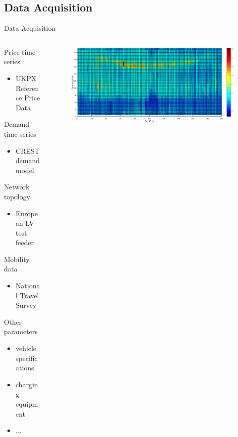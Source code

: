 \documentclass[handout]{beamer}
\begin{document}
\subsection{Data Acquisition}

\begin{frame}{Data Acquisition}
	\begin{columns}
		\begin{column}{5.5cm}
			\textcolor{UOEblue3}{Price time series}
			\begin{itemize}
				\item UKPX Reference Price Data
			\end{itemize}
			\textcolor{UOEpink}{Demand time series}
			\begin{itemize}
				\item CREST demand model
			\end{itemize}
			\textcolor{UOEorange}{Network topology}
			\begin{itemize}
				\item European LV test feeder
			\end{itemize}
			\textcolor{UOEgreen}{Mobility data}
			\begin{itemize}
				\item National Travel Survey
			\end{itemize}
			\textcolor{UOEyellow}{Other parameters}
			\begin{itemize}
				\item vehicle specifications
				\item charging equipment
				\item ...
			\end{itemize}
		\end{column}
		\begin{column}{5.5cm}
			\begin{figure}
				\includegraphics[trim={3cm 0.7cm 3cm 1cm},clip,scale = 0.18]{ukpx.eps}
			\end{figure}

\end{column}
\end{columns}
\end{frame}
\end{document}
